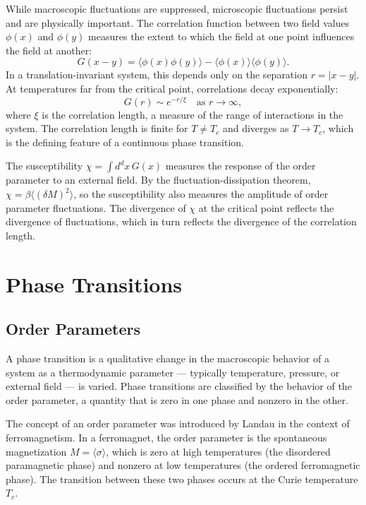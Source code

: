 \documentclass[11pt, twoside, openright]{book}
\theoremstyle{dotted}
\theoremstyle{definition}
\begin{document}
While macroscopic fluctuations are suppressed, microscopic fluctuations persist
and are physically important. The correlation function between two field values
$\phi(x)$ and $\phi(y)$ measures the extent to which the field at one point
influences the field at another:
\begin{equation}
  G(x-y) = \langle \phi(x)\phi(y)\rangle - \langle\phi(x)\rangle\langle\phi(y)\rangle.
  \label{eq:correlation_function}
\end{equation}
In a translation-invariant system, this depends only on the separation $r = |x-y|$.
At temperatures far from the critical point, correlations decay exponentially:
\begin{equation}
  G(r) \sim e^{-r/\xi} \quad \text{as } r \to \infty,
  \label{eq:exponential_decay}
\end{equation}
where $\xi$ is the correlation length, a measure of the range of interactions in
the system. The correlation length is finite for $T \neq T_c$ and diverges as
$T \to T_c$, which is the defining feature of a continuous phase transition.

The susceptibility $\chi = \int d^dx \, G(x)$ measures the response of the order
parameter to an external field. By the fluctuation-dissipation theorem,
$\chi = \beta \langle (\delta M)^2 \rangle$, so the susceptibility also measures
the amplitude of order parameter fluctuations. The divergence of $\chi$ at the
critical point reflects the divergence of fluctuations, which in turn reflects the
divergence of the correlation length.

\chapter{Phase Transitions}
\label{ch:phase_transitions}

\section{Order Parameters}

A phase transition is a qualitative change in the macroscopic behavior of a
system as a thermodynamic parameter --- typically temperature, pressure, or
external field --- is varied. Phase transitions are classified by the behavior of
the order parameter, a quantity that is zero in one phase and nonzero in the other.

The concept of an order parameter was introduced by Landau in the context of
ferromagnetism. In a ferromagnet, the order parameter is the spontaneous
magnetization $M = \langle \sigma \rangle$, which is zero at high temperatures
(the disordered paramagnetic phase) and nonzero at low temperatures (the ordered
ferromagnetic phase). The transition between these two phases occurs at the Curie
temperature $T_c$.
\end{document}
